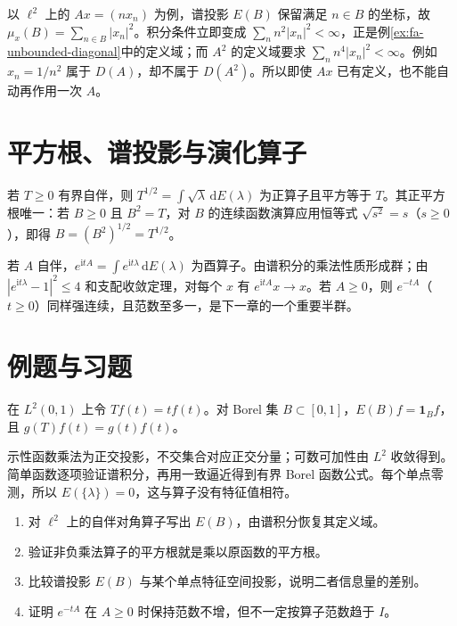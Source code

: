 以 $\ell^2$ 上的 $Ax=(nx_n)$ 为例，谱投影 $E(B)$ 保留满足 $n\in B$ 的坐标，故 $\mu_x(B)=\sum_{n\in B}|x_n|^2$。积分条件立即变成 $\sum_n n^2|x_n|^2<\infty$，正是例\ref{ex:fa-unbounded-diagonal}中的定义域；而 $A^2$ 的定义域要求 $\sum_n n^4|x_n|^2<\infty$。例如 $x_n=1/n^2$ 属于 $D(A)$，却不属于 $D(A^2)$。所以即使 $Ax$ 已有定义，也不能自动再作用一次 $A$。

\section{平方根、谱投影与演化算子}
若 $T\geq0$ 有界自伴，则 $T^{1/2}=\int\sqrt\lambda\,\mathrm dE(\lambda)$ 为正算子且平方等于 $T$。其正平方根唯一：若 $B\geq0$ 且 $B^2=T$，对 $B$ 的连续函数演算应用恒等式 $\sqrt{s^2}=s$（$s\geq0$），即得 $B=(B^2)^{1/2}=T^{1/2}$。

若 $A$ 自伴，$e^{\mathrm itA}=\int e^{\mathrm it\lambda}\,\mathrm dE(\lambda)$ 为酉算子。由谱积分的乘法性质形成群；由 $|e^{\mathrm it\lambda}-1|^2\leq4$ 和支配收敛定理，对每个 $x$ 有 $e^{\mathrm itA}x\to x$。若 $A\geq0$，则 $e^{-tA}$（$t\geq0$）同样强连续，且范数至多一，是下一章的一个重要半群。

\section{例题与习题}
\begin{example}[乘法算子的谱投影]
在 $L^2(0,1)$ 上令 $Tf(t)=tf(t)$。对 Borel 集 $B\subset[0,1]$，$E(B)f=\mathbf1_Bf$，且 $g(T)f(t)=g(t)f(t)$。
\end{example}
\begin{solve}
示性函数乘法为正交投影，不交集合对应正交分量；可数可加性由 $L^2$ 收敛得到。简单函数逐项验证谱积分，再用一致逼近得到有界 Borel 函数公式。每个单点零测，所以 $E(\{\lambda\})=0$，这与算子没有特征值相符。
\end{solve}
\begin{enumerate}
 \item 对 $\ell^2$ 上的自伴对角算子写出 $E(B)$，由谱积分恢复其定义域。
 \item 验证非负乘法算子的平方根就是乘以原函数的平方根。
 \item 比较谱投影 $E(B)$ 与某个单点特征空间投影，说明二者信息量的差别。
 \item 证明 $e^{-tA}$ 在 $A\geq0$ 时保持范数不增，但不一定按算子范数趋于 $I$。
\end{enumerate}

